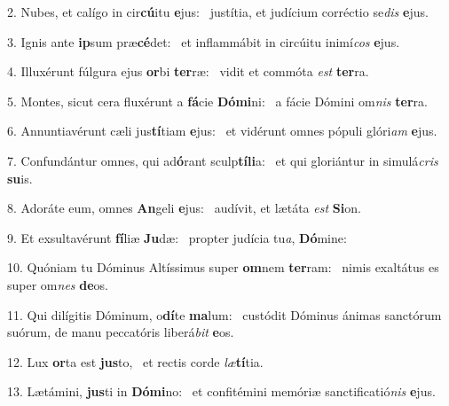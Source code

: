 2. Nubes, et calígo in cir\textbf{cú}itu \textbf{e}jus: \ast\  justítia, et judícium corréctio se\textit{dis} \textbf{e}jus.\

3. Ignis ante \textbf{ip}sum præ\textbf{cé}det: \ast\  et inflammábit in circúitu inimí\textit{cos} \textbf{e}jus.\

4. Illuxérunt fúlgura ejus \textbf{or}bi \textbf{ter}ræ: \ast\  vidit et commóta \textit{est} \textbf{ter}ra.\

5. Montes, sicut cera fluxérunt a \textbf{fá}cie \textbf{Dó}\textbf{mi}ni: \ast\  a fácie Dómini om\textit{nis} \textbf{ter}ra.\

6. Annuntiavérunt cæli jus\textbf{tí}tiam \textbf{e}jus: \ast\  et vidérunt omnes pópuli glóri\textit{am} \textbf{e}jus.\

7. Confundántur omnes, qui ad\textbf{ó}rant sculp\textbf{tí}\textbf{li}a: \ast\  et qui gloriántur in simulá\textit{cris} \textbf{su}is.\

8. Adoráte eum, omnes \textbf{An}geli \textbf{e}jus: \ast\  audívit, et lætáta \textit{est} \textbf{Si}on.\

9. Et exsultavérunt \textbf{fí}liæ \textbf{Ju}dæ: \ast\  propter judícia tu\textit{a}, \textbf{Dó}mine:\

10. Quóniam tu Dóminus Altíssimus super \textbf{om}nem \textbf{ter}ram: \ast\  nimis exaltátus es super om\textit{nes} \textbf{de}os.\

11. Qui dilígitis Dóminum, o\textbf{dí}te \textbf{ma}lum: \ast\  custódit Dóminus ánimas sanctórum suórum, de manu peccatóris liberá\textit{bit} \textbf{e}os.\

12. Lux \textbf{or}ta est \textbf{jus}to, \ast\  et rectis corde \textit{læ}\textbf{tí}tia.\

13. Lætámini, \textbf{jus}ti in \textbf{Dó}\textbf{mi}no: \ast\  et confitémini memóriæ sanctificatió\textit{nis} \textbf{e}jus.\

